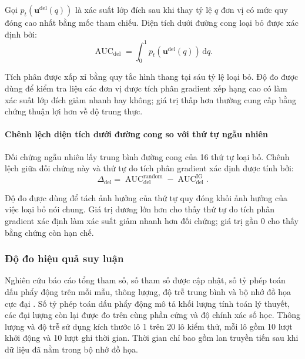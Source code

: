 Gọi $p_t(\boldsymbol{u}^{\mathrm{del}}(q))$ là xác suất lớp đích sau khi thay tỷ lệ $q$ đơn vị có mức quy đóng cao nhất bằng mốc tham chiếu. Diện tích dưới đường cong loại bỏ được xác định bởi:
\begin{equation}
\operatorname{AUC}_{\mathrm{del}}=
\int_{0}^{1}p_t\!\left(\boldsymbol{u}^{\mathrm{del}}(q)\right)\,\mathrm{d}q.
\label{eq:ch4_deletion_auc}
\end{equation}

Tích phân được xấp xỉ bằng quy tắc hình thang tại sáu tỷ lệ loại bỏ. Độ đo được dùng để kiểm tra liệu các đơn vị được tích phân gradient xếp hạng cao có làm xác suất lớp đích giảm nhanh hay không; giá trị thấp hơn thường cung cấp bằng chứng thuận lợi hơn về độ trung thực.

\paragraph{Chênh lệch diện tích dưới đường cong so với thứ tự ngẫu nhiên}

Đối chứng ngẫu nhiên lấy trung bình đường cong của 16 thứ tự loại bỏ. Chênh lệch giữa đối chứng này và thứ tự do tích phân gradient xác định được tính bởi:
\begin{equation}
\Delta_{\mathrm{del}}=
\operatorname{AUC}_{\mathrm{del}}^{\mathrm{random}}-
\operatorname{AUC}_{\mathrm{del}}^{\mathrm{IG}}.
\label{eq:ch4_deletion_gap}
\end{equation}

Độ đo được dùng để tách ảnh hưởng của thứ tự quy đóng khỏi ảnh hưởng của việc loại bỏ nói chung. Giá trị dương lớn hơn cho thấy thứ tự do tích phân gradient xác định làm xác suất giảm nhanh hơn đối chứng; giá trị gần 0 cho thấy bằng chứng còn hạn chế.

\subsubsection{Độ đo hiệu quả suy luận}

Nghiên cứu báo cáo tổng tham số, số tham số được cập nhật, số tỷ phép toán dấu phẩy động trên mỗi mẫu, thông lượng, độ trễ trung bình và bộ nhớ đồ họa cực đại \cite{Canziani2017PracticalDNN,Reddi2020MLPerfInference}. Số tỷ phép toán dấu phẩy động mô tả khối lượng tính toán lý thuyết, các đại lượng còn lại được đo trên cùng phần cứng và độ chính xác số học. Thông lượng và độ trễ sử dụng kích thước lô 1 trên 20 lô kiểm thử, mỗi lô gồm 10 lượt khởi động và 10 lượt ghi thời gian. Thời gian chỉ bao gồm lan truyền tiến sau khi dữ liệu đã nằm trong bộ nhớ đồ họa.

